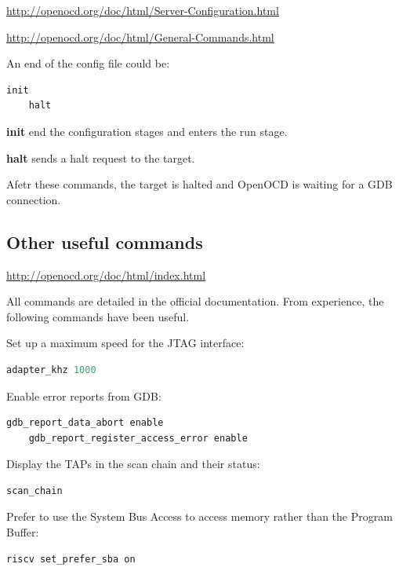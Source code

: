 \documentclass{article}
\begin{document}
    \url{http://openocd.org/doc/html/Server-Configuration.html}
    
    \url{http://openocd.org/doc/html/General-Commands.html}
    
    An end of the config file could be:
    
    \begin{lstlisting}[language=tcl]
    init
    halt
    \end{lstlisting}
    
    \textbf{init} end the configuration stages and enters the run stage.
    
    \textbf{halt} sends a halt request to the target.
    
    Afetr these commands, the target is halted and OpenOCD is waiting for a GDB connection.
    
    \subsection{Other useful commands}
    
    \url{http://openocd.org/doc/html/index.html}
    
    All commands are detailed in the official documentation. From experience, the following commands have been useful.
    
    Set up a maximum speed for the JTAG interface:
    
    \begin{lstlisting}[language=tcl]
    adapter_khz 1000
    \end{lstlisting}
    
    Enable error reports from GDB:
    
    \begin{lstlisting}[language=tcl]
    gdb_report_data_abort enable
    gdb_report_register_access_error enable
    \end{lstlisting}
    
    Display the TAPs in the scan chain and their status:
    
    \begin{lstlisting}[language=tcl]
    scan_chain
    \end{lstlisting}
    
    Prefer to use the System Bus Access to access memory rather than the Program Buffer:
    
    \begin{lstlisting}[language=tcl]
    riscv set_prefer_sba on
    \end{lstlisting}
    
\end{document}
